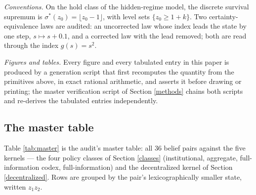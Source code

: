 \documentclass[10pt,twocolumn]{article}
\theoremstyle{definition}
\begin{document}
\emph{Conventions.} On the hold class of the hidden-regime model, the
discrete survival supremum is \(\sigma^{*}(z_0) = \lfloor z_0 - 1
\rfloor\), with level sets \(\{z_0 \ge 1 + k\}\). Two
certainty-equivalence laws are audited: an uncorrected law whose index
leads the state by one step, \(s \mapsto s + 0.1\), and a corrected law
with the lead removed; both are read through the index \(g(s) = s^{2}\).

\emph{Figures and tables.} Every figure and every tabulated entry in
this paper is produced by a generation script that first recomputes the
quantity from the primitives above, in exact rational arithmetic, and
asserts it before drawing or printing; the master verification script of
Section \ref{methods} chains both scripts and re-derives the tabulated
entries independently.

\subsection{The master table}\label{master}

Table \ref{tab:master} is the audit's master table: all 36 belief pairs
against the five kernels --- the four policy classes of Section
\ref{classes} (institutional, aggregate, full-information codex,
full-information) and the decentralized kernel of Section
\ref{decentralized}. Rows are grouped by the pair's lexicographically
smaller state, written \(z_1 z_2\).
\end{document}
